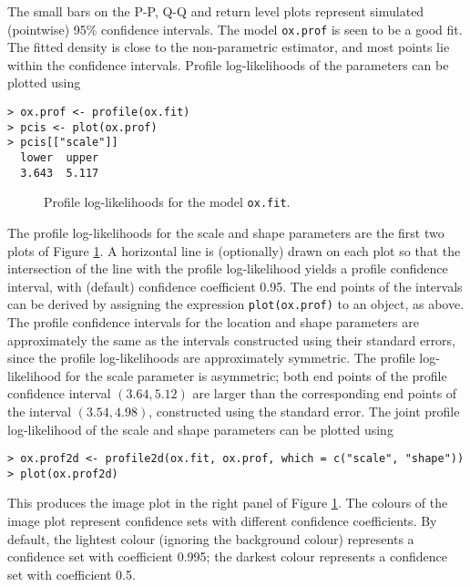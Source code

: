 \documentclass[11pt,a4paper]{article}
\begin{document}
The small bars on the P-P, Q-Q and return level plots represent simulated (pointwise) 95\% confidence intervals.
The model \verb+ox.prof+ is seen to be a good fit. 
The fitted density is close to the non-parametric estimator, and most points lie within the confidence intervals.
Profile log-likelihoods of the parameters can be plotted using

\begin{verbatim}
> ox.prof <- profile(ox.fit)
> pcis <- plot(ox.prof)
> pcis[["scale"]]
  lower  upper 
  3.643  5.117 
\end{verbatim}

\begin{figure}
\begin{center}
\vspace{-1.5cm}
\hspace{0cm}
\hspace{0cm}
\end{center} 
\caption{Profile log-likelihoods for the model \texttt{ox.fit}.}
\label{oxprof}
\end{figure}

The profile log-likelihoods for the scale and shape parameters are the first two plots of Figure \ref{oxprof}. A horizontal line is (optionally) drawn on each plot so that the intersection of the line with the profile log-likelihood yields a profile confidence interval, with (default) confidence coefficient 0.95.
The end points of the intervals can be derived by assigning the expression \verb+plot(ox.prof)+ to an object, as above.
The profile confidence intervals for the location and shape parameters are approximately the same as the intervals constructed using their standard errors, since the profile log-likelihoods are approximately symmetric.
The profile log-likelihood for the scale parameter is asymmetric; both end points of the profile confidence interval $(3.64, 5.12)$ are larger than the corresponding end points of the interval $(3.54, 4.98)$, constructed using the standard error. The joint profile log-likelihood of the scale and shape parameters can be plotted using

\begin{verbatim}
> ox.prof2d <- profile2d(ox.fit, ox.prof, which = c("scale", "shape"))
> plot(ox.prof2d)
\end{verbatim}

This produces the image plot in the right panel of Figure \ref{oxprof}. 
The colours of the image plot represent confidence sets with different confidence coefficients.
By default, the lightest colour (ignoring the background colour) represents a confidence set with coefficient 0.995; the darkest colour represents a confidence set with coefficient 0.5.
\end{document}
